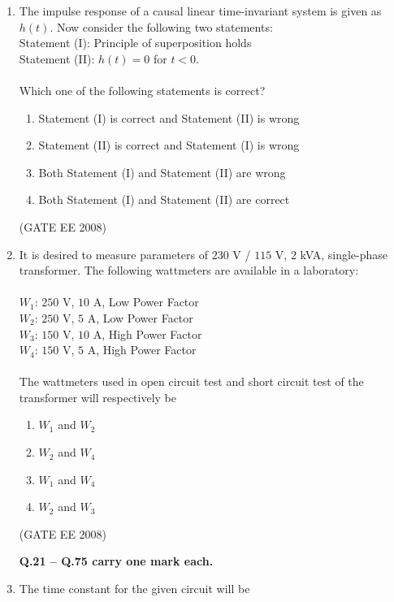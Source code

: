 \documentclass[journal,12pt,onecolumn]{IEEEtran}
\theoremstyle{remark}
\begin{document}
\begin{enumerate}[start=1, label=Q.\arabic*]
\item The impulse response of a causal linear time-invariant system is given as $h(t)$. Now consider the following two statements: \\
Statement (I): Principle of superposition holds \\
Statement (II): $h(t) = 0$ for $t < 0$. \\
\\
Which one of the following statements is correct?

\begin{enumerate}
    \item Statement (I) is correct and Statement (II) is wrong
    \item Statement (II) is correct and Statement (I) is wrong
    \item Both Statement (I) and Statement (II) are wrong
    \item Both Statement (I) and Statement (II) are correct
\end{enumerate}
\hfill (GATE EE 2008)



\item It is desired to measure parameters of $230$ V / $115$ V, $2$ kVA, single-phase transformer. The following wattmeters are available in a laboratory: \\
\\
$W_1$: $250$ V, $10$ A, Low Power Factor \\
$W_2$: $250$ V, $5$ A, Low Power Factor \\
$W_3$: $150$ V, $10$ A, High Power Factor \\
$W_4$: $150$ V, $5$ A, High Power Factor \\
\\
The wattmeters used in open circuit test and short circuit test of the transformer will respectively be

\begin{enumerate}
    \item $W_1$ and $W_2$
    \item $W_2$ and $W_4$
    \item $W_1$ and $W_4$
    \item $W_2$ and $W_3$
\end{enumerate}
\hfill (GATE EE 2008)


\Large\textbf{Q.21 -- Q.75 carry one mark each.} \\[10mm]

\item The time constant for the given circuit will be


\end{enumerate}
\end{document}
